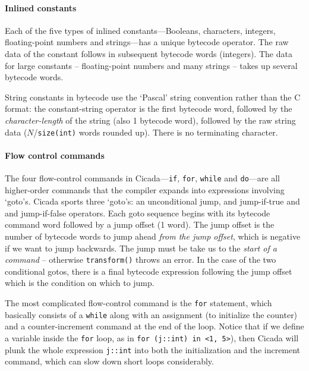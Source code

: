 \documentclass{article}
\begin{document}
\paragraph{Inlined constants}

Each of the five types of inlined constants---Booleans, characters, integers, floating-point numbers and strings---has a unique bytecode operator.  The raw data of the constant follows in subsequent bytecode words (integers).  The data for large constants -- floating-point numbers and many strings -- takes up several bytecode words.

String constants in bytecode use the `Pascal' string convention rather than the C format:  the constant-string operator is the first bytecode word, followed by the \emph{character-length} of the string (also 1 bytecode word), followed by the raw string data ($N$/\verb#size(int)# words rounded up).  There is no terminating character.



\paragraph{Flow control commands}

The four flow-control commands in Cicada---\verb#if#, \verb#for#, \verb#while# and \verb#do#---are all higher-order commands that the compiler expands into expressions involving `goto's.  Cicada sports three `goto's:  an unconditional jump, and jump-if-true and and jump-if-false operators.  Each goto sequence begins with its bytecode command word followed by a jump offset (1 word).  The jump offset is the number of bytecode words to jump ahead \emph{from the jump offset}, which is negative if we want to jump backwards.  The jump must be take us to the \emph{start of a command} -- otherwise \verb#transform()# throws an error.  In the case of the two conditional gotos, there is a final bytecode expression following the jump offset which is the condition on which to jump.

The most complicated flow-control command is the \verb#for# statement, which basically consists of a \verb#while# along with an assignment (to initialize the counter) and a counter-increment command at the end of the loop.  Notice that if we define a variable inside the \verb#for# loop, as in \verb#for (j::int) in <1, 5>#), then Cicada will plunk the whole expression \verb#j::int# into both the initialization and the increment command, which can slow down short loops considerably.
\end{document}
